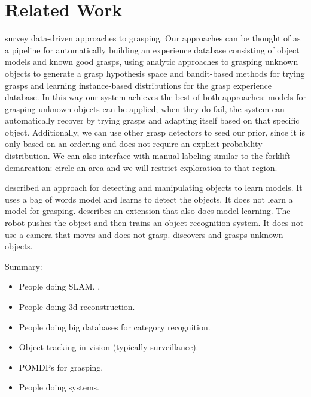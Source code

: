 \documentclass{article}
\begin{document}
\section{Related Work}

\label{sec:relatedwork}

\citet{bohg13} survey data-driven approaches to grasping.  Our
approaches can be thought of as a pipeline for automatically building
an experience database consisting of object models and known good
grasps, using analytic approaches to grasping unknown objects to
generate a grasp hypothesis space and bandit-based methods for trying
grasps and learning instance-based distributions for the grasp
experience database.  In this way our system achieves the best of both
approaches: models for grasping unknown objects can be applied; when
they do fail, the system can automatically recover by trying
grasps and adapting itself based on that specific object. Additionally, we
can use other grasp detectors to seed our prior, since it is only based
on an ordering and does not require an explicit probability distribution.
We can also interface with manual labeling similar to the forklift demarcation:
circle an area and we will restrict exploration to that region.

\citet{ude12} described an approach for detecting and manipulating
objects to learn models.  It uses a bag of words model and learns to
detect the objects.  It does not learn a model for grasping.
\citet{schiebener13} describes an extension that also does model
learning.  The robot pushes the object and then trains an object
recognition system.  It does not use a camera that moves and does not
grasp.
\citet{schiebener12} discovers and grasps unknown objects.

Summary: 
\begin{itemize}
\item People doing SLAM.  \citet{wang07, gallagher09}, 
\item People doing 3d reconstruction.   \citet{krainin11, banta00}
\item People doing big databases for category recognition.  \citet{kent14a, kent14, lai11a, goldfeder09}
\item Object tracking in vision (typically surveillance).
\item POMDPs for grasping.  \citet{platt11, hsiao10}
\item People doing systems.  \citet{hudson12, ciocarlie14}
\end{itemize}
\end{document}
